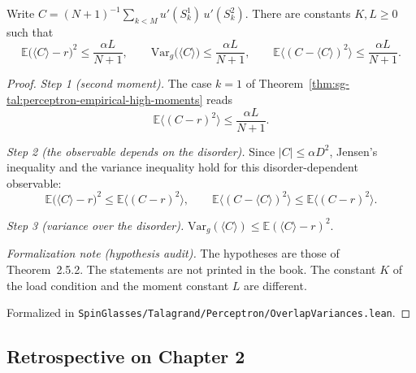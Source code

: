\begin{theorem}\label{thm:sg-tal:perceptron-constraint-variances}
  \leanok
Write $C=(N+1)^{-1}\sum_{k<M}u'(S^1_k)\,u'(S^2_k)$. There are constants $K,L\ge0$ such that
\[
 \mathbb E\bigl(\langle C\rangle-r\bigr)^2\le\frac{\alpha L}{N+1},\qquad
 \mathrm{Var}_g\bigl(\langle C\rangle\bigr)\le\frac{\alpha L}{N+1},\qquad
 \mathbb E\bigl\langle(C-\langle C\rangle)^2\bigr\rangle\le\frac{\alpha L}{N+1}.
\]
\end{theorem}
\begin{proof}
\leanok
\emph{Step 1 (second moment).} The case $k=1$ of Theorem~\ref{thm:sg-tal:perceptron-empirical-high-moments} reads
\[
 \mathbb E\bigl\langle(C-r)^2\bigr\rangle\le\frac{\alpha L}{N+1}.
\]

\emph{Step 2 (the observable depends on the disorder).} Since $|C|\le\alpha D^2$, Jensen's inequality and the
variance inequality hold for this disorder-dependent observable:
\[
 \mathbb E\bigl(\langle C\rangle-r\bigr)^2\le\mathbb E\bigl\langle(C-r)^2\bigr\rangle,\qquad
 \mathbb E\bigl\langle(C-\langle C\rangle)^2\bigr\rangle\le\mathbb E\bigl\langle(C-r)^2\bigr\rangle .
\]

\emph{Step 3 (variance over the disorder).} $\mathrm{Var}_g(\langle C\rangle)\le\mathbb E(\langle C\rangle-r)^2$.

\emph{Formalization note (hypothesis audit).} The hypotheses are those of Theorem~2.5.2. The statements are not
printed in the book. The constant $K$ of the load condition and the moment constant $L$ are different.

Formalized in \texttt{SpinGlasses/Talagrand/Perceptron/OverlapVariances.lean}.
\end{proof}

\subsection{Retrospective on Chapter 2}

